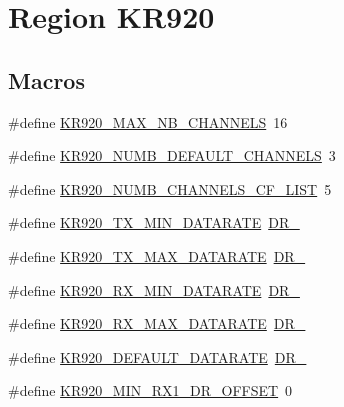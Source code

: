 \hypertarget{group__REGIONKR920}{}\section{Region K\+R920}
\label{group__REGIONKR920}
\subsection*{Macros}
\begin{DoxyCompactItemize}
\item 
\#define \hyperlink{group__REGIONKR920_ga28705c59a2c19a1de8b22d294fc6bebb}{K\+R920\+\_\+\+M\+A\+X\+\_\+\+N\+B\+\_\+\+C\+H\+A\+N\+N\+E\+LS}~16
\item 
\#define \hyperlink{group__REGIONKR920_ga52b61aaab6dd3422f4c0e0551fd810fa}{K\+R920\+\_\+\+N\+U\+M\+B\+\_\+\+D\+E\+F\+A\+U\+L\+T\+\_\+\+C\+H\+A\+N\+N\+E\+LS}~3
\item 
\#define \hyperlink{group__REGIONKR920_ga9184abc3c2682d4f7d9eee4d74bba21f}{K\+R920\+\_\+\+N\+U\+M\+B\+\_\+\+C\+H\+A\+N\+N\+E\+L\+S\+\_\+\+C\+F\+\_\+\+L\+I\+ST}~5
\item 
\#define \hyperlink{group__REGIONKR920_ga9eff66e6e0242d6a7563dd346a56e3ab}{K\+R920\+\_\+\+T\+X\+\_\+\+M\+I\+N\+\_\+\+D\+A\+T\+A\+R\+A\+TE}~\hyperlink{group__REGION_ga6c4ef966b4f3d5eb7597b087f2b97095}{D\+R\+\_}
\item 
\#define \hyperlink{group__REGIONKR920_ga58a4171632a233925b8b0153c66a6ff3}{K\+R920\+\_\+\+T\+X\+\_\+\+M\+A\+X\+\_\+\+D\+A\+T\+A\+R\+A\+TE}~\hyperlink{group__REGION_ga872e12c82020c02a7f70a1c6ed1375df}{D\+R\+\_}
\item 
\#define \hyperlink{group__REGIONKR920_ga07e6cd760fe7f1fc3a572fdf20ceebb6}{K\+R920\+\_\+\+R\+X\+\_\+\+M\+I\+N\+\_\+\+D\+A\+T\+A\+R\+A\+TE}~\hyperlink{group__REGION_ga6c4ef966b4f3d5eb7597b087f2b97095}{D\+R\+\_}
\item 
\#define \hyperlink{group__REGIONKR920_gae396329e09e498a769761010503fb797}{K\+R920\+\_\+\+R\+X\+\_\+\+M\+A\+X\+\_\+\+D\+A\+T\+A\+R\+A\+TE}~\hyperlink{group__REGION_ga872e12c82020c02a7f70a1c6ed1375df}{D\+R\+\_}
\item 
\#define \hyperlink{group__REGIONKR920_ga574a2f448e5bde55946a05487bcc6de4}{K\+R920\+\_\+\+D\+E\+F\+A\+U\+L\+T\+\_\+\+D\+A\+T\+A\+R\+A\+TE}~\hyperlink{group__REGION_ga6c4ef966b4f3d5eb7597b087f2b97095}{D\+R\+\_}
\item 
\#define \hyperlink{group__REGIONKR920_ga908e343791acd6310a55ed1eb947ccd4}{K\+R920\+\_\+\+M\+I\+N\+\_\+\+R\+X1\+\_\+\+D\+R\+\_\+\+O\+F\+F\+S\+ET}~0

\end{DoxyCompactItemize}
